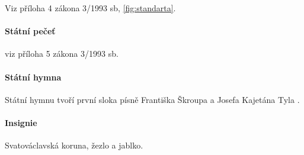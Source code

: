 \documentclass[10pt,a4paper,
twoside,%
]{report}
\begin{document}
Viz příloha 4 zákona 3/1993 sb, \ref{fig:standarta}.

\paragraph{Státní pečeť} viz příloha 5 zákona 3/1993 sb.

\paragraph{Státní hymna} Státní hymnu tvoří první sloka písně Františka Škroupa a Josefa Kajetána Tyla .

\paragraph{Insignie} Svatováclavská koruna, žezlo a jablko.
\end{document}
